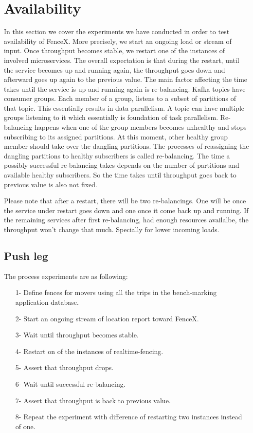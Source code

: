 \documentclass[a4]{report}
\begin{document}
        \section{Availability}
        In this section we cover the experiments we have conducted in order to test availability of FenceX.
        More precisely, we start an ongoing load or stream of input.
        Once throughput becomes stable, we restart one of the instances of involved microservices.
        The overall expectation is that during the restart, until the service becomes up and running again, the throughput
        goes down and afterward goes up again to the previous value.
        The main factor affecting the time takes until the service is up and running again is re-balancing.
        Kafka topics have consumer groups.
        Each member of a group, listens to a subset of partitions of that topic.
        This essentially results in data parallelism.
        A topic can have multiple groups listening to it which essentially is foundation of task parallelism.
        Re-balancing happens when one of the group members becomes unhealthy and stops subscribing to its assigned
        partitions.
        At this moment, other healthy group member should take over the dangling partitions.
        The processes of reassigning the dangling partitions to healthy subscribers is called re-balancing.
        The time a possibly successful re-balancing takes depends on the number of partitions and available
        healthy subscribers.
        So the time takes until throughput goes back to previous value is also not fixed.

        Please note that after a restart, there will be two re-balancings.
        One will be once the service under restart goes down and one once it come back up and running.
        If the remaining services after first re-balancing, had enough resources availalbe, the throughput won't change
        that much.
        Specially for lower incoming loads.

        \subsection{Push leg}
        The process experiments are as following:
        \begin{itemize}
            \item[1-] Define fences for movers using all the trips in the bench-marking application database.
            \item[2-] Start an ongoing stream of location report toward FenceX.
            \item[3-] Wait until throughput becomes stable.
            \item[4-] Restart on of the instances of realtime-fencing.
            \item[5-] Assert that throughput drops.
            \item[6-] Wait until successful re-balancing.
            \item[7-] Assert that throughput is back to previous value.
            \item[8-] Repeat the experiment with difference of restarting two instances instead of one.
        \end{itemize}
\end{document}
